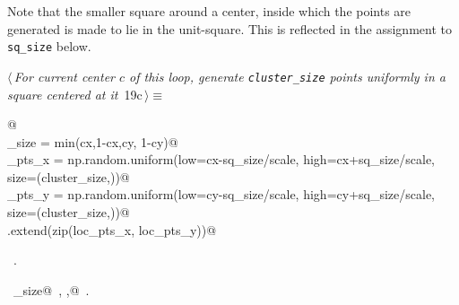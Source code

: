 \documentclass[11.5pt]{report}
\begin{document}
\vspace{-0.8cm} \newchunk Note that the smaller square around a center, inside which the points are generated is made to lie 
in the unit-square. This is reflected in the assignment to \verb|sq_size| below. 
\begin{flushleft} \small
\begin{minipage}{\linewidth}\label{scrap20}\raggedright\small
{} $\langle\,${\itshape For current center $c$ of this loop, generate \verb|cluster_size| points uniformly in a square centered at it}\nobreak\ {\footnotesize {19c}}$\,\rangle\equiv$
\vspace{-1ex}
\begin{list}{}{} \item
\mbox{}\verb@   @\\
\mbox{}\verb@sq_size      = min(cx,1-cx,cy, 1-cy)@\\
\mbox{}\verb@loc_pts_x    = np.random.uniform(low=cx-sq_size/scale, high=cx+sq_size/scale, size=(cluster_size,))@\\
\mbox{}\verb@loc_pts_y    = np.random.uniform(low=cy-sq_size/scale, high=cy+sq_size/scale, size=(cluster_size,))@\\
\mbox{}\verb@points.extend(zip(loc_pts_x, loc_pts_y))@\\
\mbox{}\verb@@{\NWsep}
\end{list}
\vspace{-1.5ex}
\footnotesize
\begin{list}{}{\setlength{\itemsep}{-\parsep}\setlength{\itemindent}{-\leftmargin}}
\item \NWtxtMacroRefIn\ .
\item \NWtxtIdentsUsed\nobreak\  \verb@cluster_size@\nobreak\ , \verb@scale,@\nobreak\ .
\item{}
\end{list}
\end{minipage}\vspace{4ex}
\end{flushleft}
\end{document}
